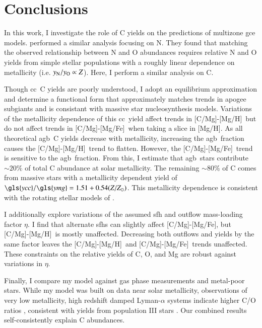 \documentclass[12pt,oneside,letterpaper]{report}
\newcommand{\cc}{\gls{cc}}
\newcommand{\agb}{\gls{agb}}
\newcommand{\sfh}{\gls{sfh}}
\newcommand{\gce}{\gls{gce}}
\newcommand{\apogee}{\gls{apogee}}
\newcommand{\Ycc}{\gls{ycc}}
\newcommand{\Yoc}{\gls{ymg}}
\newcommand{\caah}{[C/Mg]-[Mg/H]}
\newcommand{\caafe}{[C/Mg]-[Mg/Fe]}
\newcommand{\about}[1]{${\sim} #1$}
\begin{document}
\chapter{Conclusions}

In this work, I investigate the role of C yields on the predictions of multizone \gce{} models. \citet{james+23} performed a similar analysis focusing on N. They found that matching the observed relationship between N and O abundances \citep{HEK00,PVT10,berg+12, berg+20, skillman+20, izotov+12, james2+15, dopita+16} requires relative N and O yields from simple stellar populations with a roughly linear dependence on metallicity (i.e. $y_{\rm N}/y_{\rm O} \propto Z$). 
Here, I perform a similar analysis on C. 

Though \cc\ C yields are poorly understood, I adopt an equilibrium approximation and determine a functional form that approximately matches trends in \apogee{} subgiants and is consistant with massive star nucleosynthesis models. Variations of the metallicity dependence of this \cc\ yield affect trends in \caah~but do not affect trends in \caafe\ when taking a slice in [Mg/H]. As all theoretical \agb\ C yields decrease with metallicity, increasing the \agb\ fraction causes the \caah\ trend to flatten. However, the \caafe\ trend is sensitive to the \agb\ fraction. 
From this, I estimate that \agb\ stars contribute \about{20\%} of total C abundance at solar metallicity. The remaining \about{80\%} of C comes from massive stars with a metallicity dependent yield of $\Ycc/\Yoc=1.51 + 0.54 (Z/Z_\odot)$. 
This metallicity dependence is consistent with the rotating stellar models of \citet{LC18}. 
 

I additionally explore variations of the assumed \sfh{} and outflow mass-loading factor $\eta$. I find that alternate \sfh{}s can slightly affect \caafe, but \caah~is mostly unaffected. Decreasing both outflows and yields by the same factor leaves the \caah~and \caafe~trends unaffected. These constraints on the relative yields of C, O, and Mg are robust against variations in $\eta$.

Finally, I compare my model against gas phase measurements and metal-poor stars. While my model was built on data near solar metallicity, observations of very low metallicity, high redshift damped Lyman-$\alpha$ systems indicate higher C/O ratios \citep{cooke+17}, consistent with yields from population III stars \citep[e.g.][]{hirschi07}. Our combined results self-consistently explain C abundances. 
\end{document}
